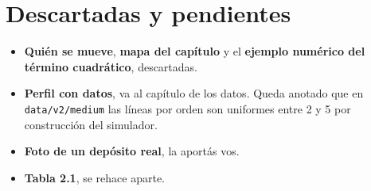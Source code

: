 \documentclass[a4paper,10pt]{article}
\begin{document}
\clearpage
\section{Descartadas y pendientes}
\begin{itemize}
    \item \textbf{Quién se mueve}, \textbf{mapa del capítulo} y el
    \textbf{ejemplo numérico del término cuadrático}, descartadas.
    \item \textbf{Perfil con datos}, va al capítulo de los datos. Queda anotado
    que en \texttt{data/v2/medium} las líneas por orden son uniformes entre 2 y
    5 por construcción del simulador.
    \item \textbf{Foto de un depósito real}, la aportás vos.
    \item \textbf{Tabla 2.1}, se rehace aparte.
\end{itemize}
\end{document}
